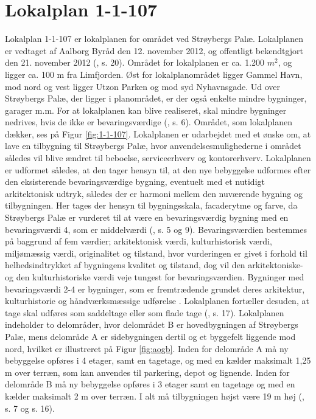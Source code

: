 \section{Lokalplan 1-1-107}
Lokalplan 1-1-107 er lokalplanen for området ved Strøybergs Palæ. Lokalplanen er vedtaget af Aalborg Byråd den 12. november 2012, og offentligt bekendtgjort den 21. november 2012 (\citep{lokalplan}, s. 20).
\newline \indent{     }  Området for lokalplanen er ca. 1.200 $m^2$, og ligger ca. 100 m fra Limfjorden. Øst for lokalplanområdet ligger Gammel Havn, mod nord og vest ligger Utzon Parken og mod syd Nyhavnsgade. Ud over Strøybergs Palæ, der ligger i planområdet, er der også enkelte mindre bygninger, garager m.m. For at lokalplanen kan blive realiseret, skal mindre bygninger nedrives, hvis de ikke er bevaringsværdige (\citep{lokalplan}, s. 6). Området, som lokalplanen dækker, ses på Figur \ref{fig:1-1-107}.
\newline \indent{     }  Lokalplanen er udarbejdet med et ønske om, at lave en tilbygning til Strøybergs Palæ, hvor anvendelsesmulighederne i området således vil blive ændret til beboelse, serviceerhverv og kontorerhverv. Lokalplanen er udformet således, at den tager hensyn til, at den nye bebyggelse udformes efter den eksisterende bevaringsværdige bygning, eventuelt med et nutidigt arkitektonisk udtryk, således der er harmoni mellem den nuværende bygning og tilbygningen. Her tages der hensyn til bygningsskala, facaderytme og farve, da Strøybergs Palæ er vurderet til at være en bevaringsværdig bygning med en bevaringsværdi 4, som er middelværdi (\citep{lokalplan}, s. 5 og 9). Bevaringsværdien bestemmes på baggrund af fem værdier; arkitektonisk værdi, kulturhistorisk værdi, miljømæssig værdi, originalitet og tilstand, hvor vurderingen er givet i forhold til helhedsindtrykket af bygningens kvalitet og tilstand, dog vil den arkitektoniske- og den kulturhistoriske værdi veje tungest for bevaringsværdien. Bygninger med bevaringsværdi 2-4 er bygninger, som er fremtrædende grundet deres arkitektur, kulturhistorie og håndværksmæssige udførelse \citep{bevaringsvaerdi}. Lokalplanen fortæller desuden, at tage skal udføres som saddeltage eller som flade tage (\citep{lokalplan}, s. 17).
\newline \indent{     }  Lokalplanen indeholder to delområder, hvor delområdet B er hovedbygningen af Strøybergs Palæ, mens delområde A er sidebygningen dertil og et byggefelt liggende mod nord, hvilket er illustreret på Figur \ref{fig:aogb}. Inden for delområde A må ny bebyggelse opføres i 4 etager, samt en tagetage, og med en kælder maksimalt 1,25 m over terræn, som kan anvendes til parkering, depot og lignende. Inden for delområde B må ny bebyggelse opføres i 3 etager samt en tagetage og med en kælder maksimalt 2 m over terræn. I alt må tilbygningen højst være 19 m høj (\citep{lokalplan}, s. 7 og s. 16).


